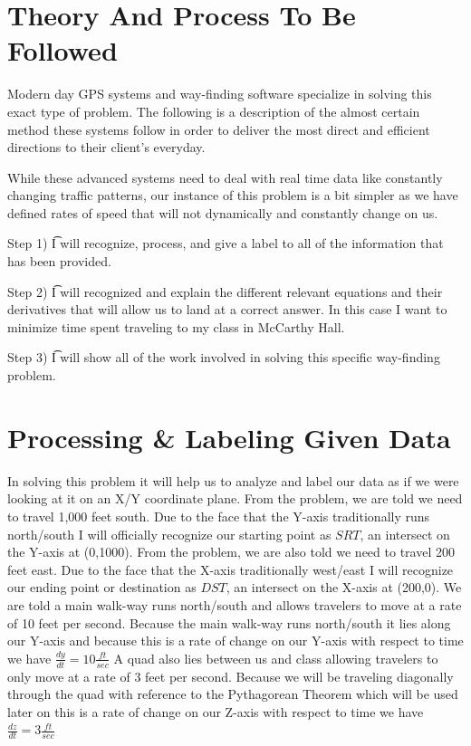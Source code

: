 \documentclass{article}
\begin{document}
\section{Theory And Process To Be Followed}

Modern day GPS systems and way-finding software specialize in solving this exact type of problem. The following is a description of the almost certain method these systems follow in order to deliver the most direct and efficient directions to their client's everyday.

While these advanced systems need to deal with real time data like constantly changing traffic patterns, our instance of this problem is a bit simpler as we have defined rates of speed that will not dynamically and constantly change on us.

Step 1) \t I will recognize, process, and give a label to all of the information that has been provided.

Step 2) \t I will recognized and explain the different relevant equations and their derivatives that will allow us to land at a correct answer. In this case I want to minimize time spent traveling to my class in McCarthy Hall.

Step 3) \t I will show all of the work involved in solving this specific way-finding problem.

\section{Processing \& Labeling Given Data}

In solving this problem it will help us to analyze and label our data as if we were looking at it on an X/Y coordinate plane.
From the problem, we are told we need to travel 1,000 feet south. Due to the face that the Y-axis traditionally runs north/south I will officially recognize our starting point as $ SRT $, an intersect on the Y-axis at (0,1000).
From the problem, we are also told we need to travel 200 feet east. Due to the face that the X-axis traditionally west/east I will recognize our ending point or destination as $ DST $, an intersect on the X-axis at (200,0). 
We are told a main walk-way runs north/south and allows travelers to move at a rate of 10 feet per second. Because the main walk-way runs north/south it lies along our Y-axis and because this is a rate of change on our Y-axis with respect to time we have $ \frac{dy}{dt} = 10\frac{ft}{sec} $ 
A quad also lies between us and class allowing travelers to only move at a rate of 3 feet per second. Because we will be traveling diagonally through the quad with reference to the Pythagorean Theorem which will be used later on this is a rate of change on our Z-axis with respect to time we have $ \frac{dz}{dt} = 3\frac{ft}{sec} $ 
\end{document}
